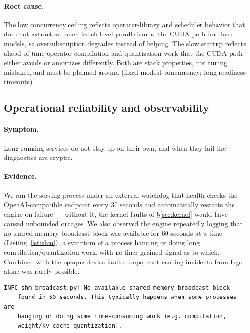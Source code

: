 \documentclass{article}
\begin{document}
\paragraph{Root cause.} The low concurrency ceiling reflects operator-library and
scheduler behavior that does not extract as much batch-level parallelism as the
CUDA path for these models, so oversubscription degrades instead of helping. The
slow startup reflects ahead-of-time operator compilation and quantization work
that the CUDA path either avoids or amortizes differently. Both are stack
properties, not tuning mistakes, and must be planned around (fixed modest
concurrency; long readiness timeouts).

\subsection{Operational reliability and observability}
\label{sec:reliability}
\paragraph{Symptom.} Long-running services do not stay up on their own, and when
they fail the diagnostics are cryptic.

\paragraph{Evidence.} We ran the serving process under an external watchdog that
health-checks the OpenAI-compatible endpoint every 30 seconds and automatically
restarts the engine on failure --- without it, the kernel faults of
\S\ref{sec:kernel} would have caused unbounded outages. We also observed the
engine repeatedly logging that no shared-memory broadcast block was available for
60 seconds at a time (Listing~\ref{lst:shm}), a symptom of a process hanging or
doing long compilation/quantization work, with no finer-grained signal as to
which. Combined with the opaque device fault dumps, root-causing incidents from
logs alone was rarely possible.

\begin{lstlisting}[caption={Repeated shared-memory broadcast stall, indicating a hang or long-running compilation/quantization step.},label={lst:shm}]
INFO shm_broadcast.py] No available shared memory broadcast block
    found in 60 seconds. This typically happens when some processes are
    hanging or doing some time-consuming work (e.g. compilation,
    weight/kv cache quantization).
\end{lstlisting}
\end{document}
